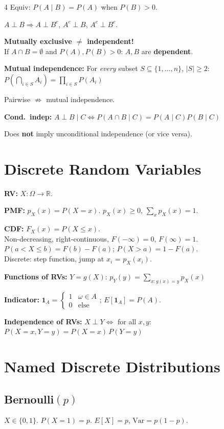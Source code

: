 \documentclass[6pt]{article}
\begin{document}
\begin{multicols}{4}
Equiv: $P(A\mid B)=P(A)$ when $P(B)>0$.

$A\perp B \Rightarrow A\perp B^c$, $A^c\perp B$, $A^c\perp B^c$.

\textbf{Mutually exclusive $\neq$ independent!}\\
If $A\cap B=\emptyset$ and $P(A),P(B)>0$: $A,B$ are \textbf{dependent}.

\textbf{Mutual independence:} For \emph{every} subset $S\subseteq\{1,\ldots,n\}$, $|S|\geq 2$:
$P(\bigcap_{i\in S} A_i) = \prod_{i\in S} P(A_i)$

Pairwise $\not\Rightarrow$ mutual independence.

\textbf{Cond.\ indep:} $A\perp B\mid C \iff P(A\cap B\mid C)=P(A\mid C)P(B\mid C)$

Does \textbf{not} imply unconditional independence (or vice versa).

\section{Discrete Random Variables}

\textbf{RV:} $X:\Omega\to\mathbb{R}$.

\textbf{PMF:} $p_X(x)=P(X=x)$. \;$p_X(x)\geq0$, $\sum_x p_X(x)=1$.

\textbf{CDF:} $F_X(x)=P(X\leq x)$.\\
Non-decreasing, right-continuous, $F(-\infty)=0$, $F(\infty)=1$.\\
$P(a<X\leq b)=F(b)-F(a)$;\; $P(X>a)=1-F(a)$.\\
Discrete: step function, jump at $x_i$ = $p_X(x_i)$.

\textbf{Functions of RVs:} $Y=g(X)$: $p_Y(y)=\sum_{x:g(x)=y} p_X(x)$

\textbf{Indicator:} $\mathbf{1}_A = \begin{cases}1 & \omega\in A\\0 & \text{else}\end{cases}$;\; $E[\mathbf{1}_A]=P(A)$.

\textbf{Independence of RVs:} $X\perp Y \iff$ for all $x,y$:\\
$P(X{=}x,Y{=}y)=P(X{=}x)\,P(Y{=}y)$

\section{Named Discrete Distributions}

\subsection{Bernoulli$(p)$}
$X\in\{0,1\}$. $P(X{=}1)=p$. $E[X]=p$, $\text{Var}=p(1{-}p)$.


\end{multicols}
\end{document}
